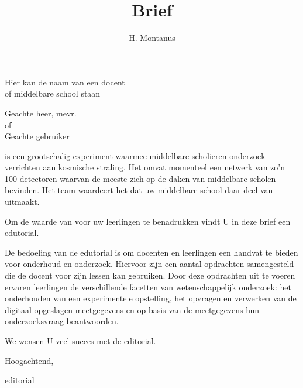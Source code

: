 




\title{Brief}
\author{H. Montanus}
\date{}

\maketitle
 
Hier kan de naam van een docent \\ of middelbare school staan

Geachte heer, mevr.  \\of   \\Geachte \hisparc gebruiker

\hisparc is een grootschalig experiment waarmee middelbare scholieren
onderzoek verrichten aan kosmische straling. Het omvat momenteel een
netwerk van zo'n 100 detectoren waarvan de meeste zich op de daken van
middelbare scholen bevinden. Het \hisparc team waardeert het dat uw
middelbare school daar deel van uitmaakt.  

Om de waarde van \hisparc voor uw leerlingen te benadrukken vindt U in
deze brief een \hisparc edutorial.

De bedoeling van de edutorial is om docenten en leerlingen een handvat
te bieden voor onderhoud en onderzoek. Hiervoor zijn een aantal
opdrachten samengesteld die de docent voor zijn lessen kan gebruiken.
Door deze opdrachten uit te voeren ervaren leerlingen de verschillende
facetten van wetenschappelijk onderzoek: het onderhouden van een
experimentele opstelling, het opvragen en verwerken van de digitaal
opgeslagen meetgegevens en op basis van de meetgegevens hun
onderzoeksvraag beantwoorden. 

We wensen U veel succes met de \hisparc editorial.
 
Hoogachtend,

\hisparc editorial
 
 

